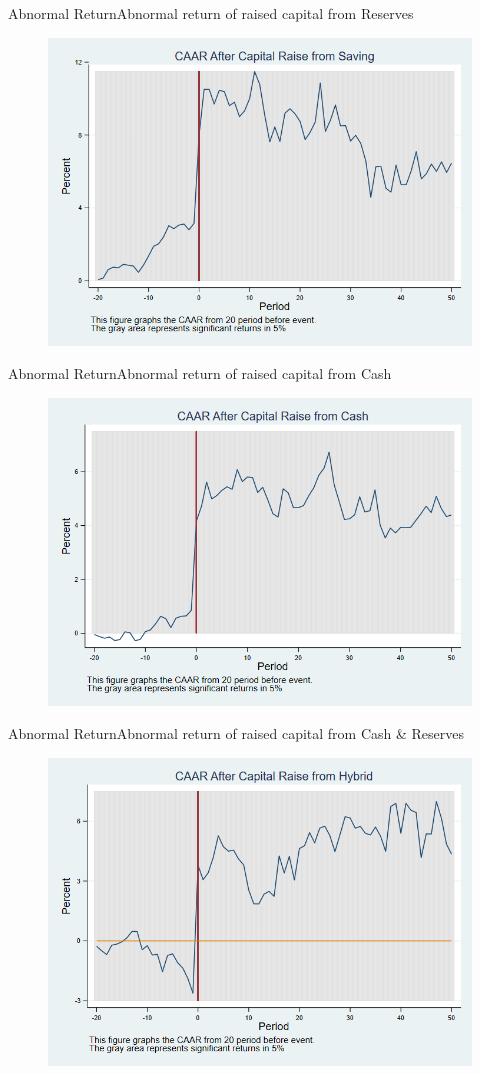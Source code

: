 \documentclass{beamer}
\begin{document}
	
	\begin{frame}{Abnormal Return}{Abnormal return of raised capital from Reserves}
		\label{car_abnormalreturn2Saving}
		\begin{figure}
			\centering
			\includegraphics[width=0.65\linewidth]{Output/car_abnormalreturn2Saving.png}
			\label{fig:car_abnormalreturn2Saving}
		\end{figure}
	\end{frame}
	
	
	\begin{frame}{Abnormal Return}{Abnormal return of raised capital from Cash}
		\label{car_abnormalreturn2Cash}
		\begin{figure}
			\centering
			\includegraphics[width=0.65\linewidth]{Output/car_abnormalreturn2Cash.png}
			\label{fig:car_abnormalreturn2Cash}
		\end{figure}
		
	\end{frame}
	
	\begin{frame}{Abnormal Return}{Abnormal return of raised capital from Cash \& Reserves}
		\label{car_abnormalreturn2Hybrid}
		\begin{figure}
			\centering
			\includegraphics[width=0.65\linewidth]{Output/car_abnormalreturn2Hybrid.png}
			\label{fig:car_abnormalreturn2Hybrid}
		\end{figure}
	\end{frame}
	
\end{document}
